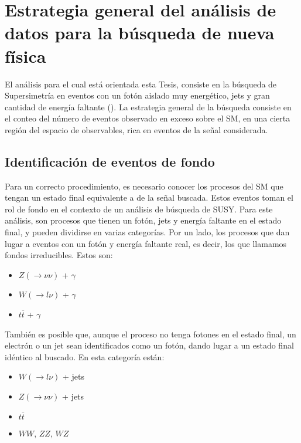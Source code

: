 \chapter{Estrategia general del análisis de datos para la búsqueda de nueva física}



El análisis para el cual está orientada esta Tesis, consiste en la búsqueda de Supersimetría en eventos con un fotón aislado muy energético, jets y gran cantidad de energía faltante (). La estrategia general de la búsqueda consiste en el conteo del número de eventos observado en exceso sobre el SM, en una cierta región del espacio de observables, rica en eventos de la señal considerada.


\section{Identificación de eventos de fondo}

Para un correcto procedimiento, es necesario conocer los procesos del SM que tengan un estado final equivalente a de la señal buscada. Estos eventos toman el rol de fondo en el contexto de un análisis de búsqueda de SUSY. Para este análisis, son procesos que tienen un fotón, jets y energía faltante en el estado final, y pueden dividirse en varias categorías. Por un lado, los procesos que dan lugar a eventos con un fotón y energía faltante
real, es decir, los que llamamos fondos irreducibles. Estos son:

\begin{itemize}

	\item $Z(\rightarrow \nu\nu)$ + $\gamma$

	\item $W (\rightarrow l\nu)$ + $\gamma$

	\item $t \overline{t}$ + $\gamma$

\end{itemize}

También es posible que, aunque el proceso no tenga fotones en el estado final, un electrón o un jet sean identificados como un fotón, dando lugar a un estado final idéntico al buscado. En esta categoría están:

\begin{itemize}

	\item $W (\rightarrow l\nu)$ + jets

	\item $Z (\rightarrow \nu\nu)$ + jets

	\item $t \overline{t}$

	\item $WW$, $ZZ$, $WZ$

\end{itemize}

